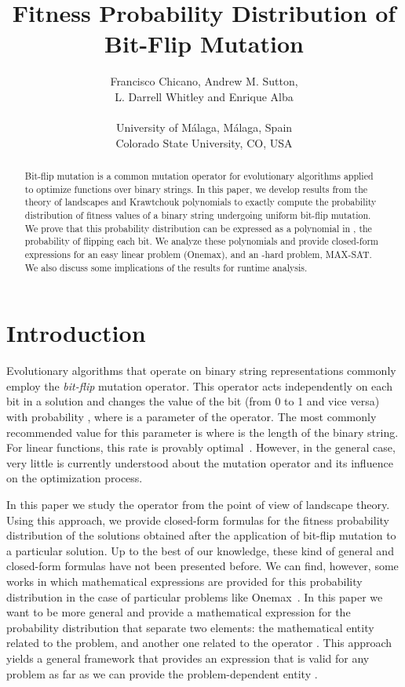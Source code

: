 \documentclass{article}
\title{Fitness Probability Distribution of Bit-Flip Mutation}
\author{Francisco Chicano, Andrew M. Sutton, \\L. Darrell Whitley and Enrique Alba \\
\\
University of M\'alaga, M\'alaga, Spain\\
Colorado State University, CO, USA
}
\date{}
\begin{document}
\maketitle

\begin{abstract}
Bit-flip mutation is a common mutation operator for evolutionary algorithms applied to optimize functions over binary strings. In this paper, we develop results from the theory of landscapes and Krawtchouk polynomials to exactly compute the probability distribution of fitness values of a binary string undergoing uniform bit-flip mutation. We prove that this probability distribution can be expressed as a polynomial in , the probability of flipping each bit. We analyze these polynomials and provide closed-form expressions for an easy linear problem (Onemax), and an -hard problem, MAX-SAT. We also discuss some implications of the results for runtime analysis.
\end{abstract}







\parskip=0.00in


\section{Introduction}
\label{sec:intro}

Evolutionary algorithms that operate on binary string representations commonly employ the \emph{bit-flip} mutation operator.  This operator acts independently on each bit in a solution and changes the value of the bit (from 0 to 1 and vice versa) with probability , where  is a parameter of the operator.  The most commonly recommended value for this parameter is  where  is the length of the binary string. For linear functions, this rate is provably optimal~\citep{Witt2013tight}. However, in the general case, very little is currently understood about the mutation operator and its influence on the optimization process.

In this paper we study the operator from the point of view of landscape theory. Using this approach, we provide closed-form formulas for the fitness probability distribution of the solutions obtained after the application of bit-flip mutation to a particular solution. Up to the best of our knowledge, these kind of general and closed-form formulas have not been presented before. We can find, however, some works in which mathematical expressions are provided for this probability distribution in the case of particular problems like Onemax~\citep{Garnier1999}. In this paper we want to be more general and provide a mathematical expression for the probability distribution that separate two elements: the mathematical entity related to the problem,  and another one related to the operator . This approach yields a general framework that provides an expression that is valid for any problem as far as we can provide the problem-dependent entity .
\end{document}
